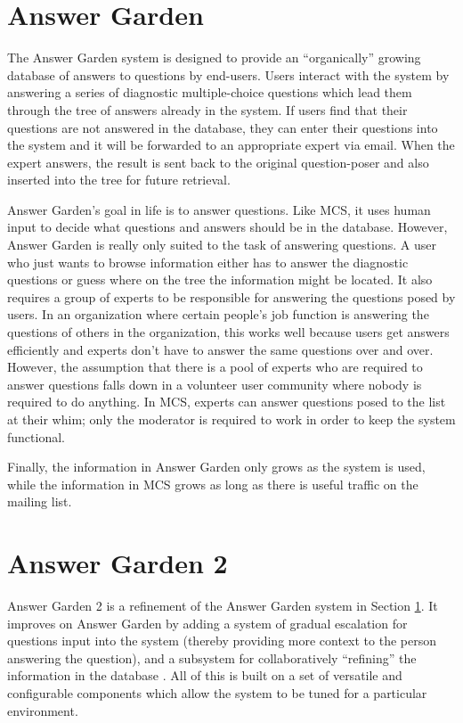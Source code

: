 \section{Answer Garden}
\label{sec:answer-garden}
The Answer Garden system is designed to provide an ``organically'' growing
database of answers to questions by end-users\cite{Ackerman90}. Users interact
with the system by answering a series of diagnostic multiple-choice questions
which lead them through the tree of answers already in the system. If users
find that their questions are not answered in the database, they can enter
their questions into the system and it will be forwarded to an appropriate
expert via email. When the expert answers, the result is sent back to the
original question-poser and also inserted into the tree for future retrieval.

Answer Garden's goal in life is to answer questions. Like MCS, it uses human
input to decide what questions and answers should be in the database. However,
Answer Garden is really only suited to the task of answering questions. A user
who just wants to browse information either has to answer the diagnostic
questions or guess where on the tree the information might be located. It also
requires a group of experts to be responsible for answering the questions posed
by users. In an organization where certain people's job function is answering
the questions of others in the organization, this works well because users get
answers efficiently and experts don't have to answer the same questions over
and over. However, the assumption that there is a pool of experts who are
required to answer questions falls down in a volunteer user community where
nobody is required to do anything. In MCS, experts can answer questions posed
to the list at their whim; only the moderator is required to work in order to
keep the system functional.

Finally, the information in Answer Garden only grows as the system is 
used, while the information in MCS grows as long as there is useful traffic on
the mailing list.

\section{Answer Garden 2}
Answer Garden 2 is a refinement of the Answer Garden system in Section
\ref{sec:answer-garden}. It improves on Answer Garden by adding a system of gradual
escalation for questions input into the system (thereby providing more context
to the person answering the question), and a subsystem for collaboratively
``refining'' the information in the database \cite{cscw96*97}. All of this is
built on a set of versatile and configurable components which allow the system
to be tuned for a particular environment.

